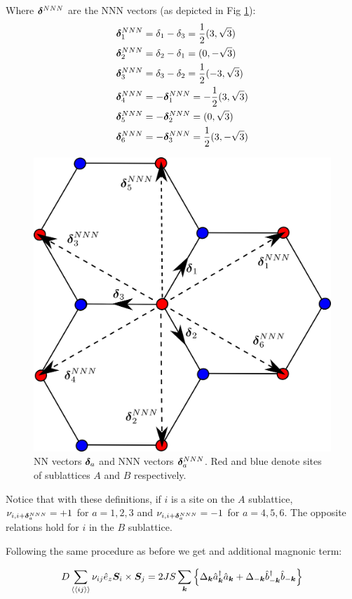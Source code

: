 Where $\boldsymbol{\delta}^{NNN}$ are the NNN vectors (as depicted in Fig \ref{Fig.Magnon.Vecs}):
\begin{align*}
\boldsymbol{\delta}^{NNN}_1 &= \delta_1-\delta_3 = \frac{1}{2}(3, \sqrt{3}) \\
\boldsymbol{\delta}^{NNN}_2 &= \delta_2-\delta_1 = (0, -\sqrt{3}) \\
\boldsymbol{\delta}^{NNN}_3 &= \delta_3-\delta_2 = \frac{1}{2}(-3, \sqrt{3}) \\
\boldsymbol{\delta}^{NNN}_4 &= -\boldsymbol{\delta}^{NNN}_1 = -\frac{1}{2}(3, \sqrt{3}) \\
\boldsymbol{\delta}^{NNN}_5 &= -\boldsymbol{\delta}^{NNN}_2 = (0, \sqrt{3}) \\
\boldsymbol{\delta}^{NNN}_6 &= -\boldsymbol{\delta}^{NNN}_3 = \frac{1}{2}(3, -\sqrt{3}) \\
\end{align*}
\begin{figure}
\centering
  \includegraphics[width=0.7\linewidth]{../Figures/NNNvec.png}
  \caption{NN vectors $\boldsymbol{\delta}_a$ and NNN vectors $\boldsymbol{\delta}^{NNN}_a$. Red and blue denote sites of sublattices $A$ and $B$ respectively.}
\label{Fig.Magnon.Vecs}
\end{figure}
Notice that with these definitions, if $i$ is a site on the $A$ sublattice, $\nu_{i,i+\boldsymbol{\delta}^{NNN}_a}=+1$ for $a=1,2,3$ and $\nu_{i,i+\boldsymbol{\delta}^{NNN}_a}=-1$ for $a=4,5,6$. The opposite relations hold for $i$ in the $B$ sublattice.

 Following the same procedure as before we get and additional magnonic term:

\begin{equation}
D \sum_{\langle \langle i j \rangle \rangle} \nu_{ij}\hat{e}_z \boldsymbol{S}_i \times \boldsymbol{S}_j = 2JS\sum_{\boldsymbol{k}} \left\{ \Delta_{\boldsymbol{k}}\hat{a}^\dagger_{\boldsymbol{k}}\hat{a}_{\boldsymbol{k}} + \Delta_{-\boldsymbol{k}}\hat{b}^\dagger_{-\boldsymbol{k}}\hat{b}_{-\boldsymbol{k}} \right\}
\end{equation}

